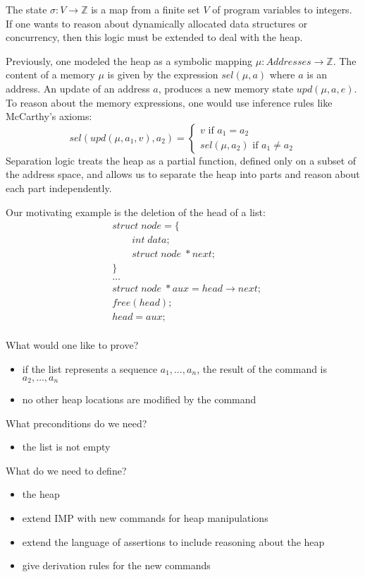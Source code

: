 \documentclass[12pt]{article}
\begin{document}
The state $\sigma : V \to \mathbb{Z}$ is a map from a finite set $V$ of program variables to integers. If one wants to reason about dynamically allocated data structures or concurrency, then this logic must be extended to deal with the heap. 

Previously, one modeled the heap as a symbolic mapping $\mu : Addresses \to \mathbb{Z}$. The content of a memory $\mu$ is given by the expression $sel(\mu,a)$ where $a$ is an address. An update of an address $a$, produces a new memory state $upd(\mu,a,e)$. To reason about the memory expressions, one would use inference rules like McCarthy's axioms:
\[
sel(upd(\mu,a_1,v), a_2)= \begin{cases}
v \mbox{ if } a_1 = a_2\\
sel(\mu,a_2) \mbox{ if } a_1 \neq a_2
\end{cases}
\]
Separation logic treats the heap as a partial function, defined only on a subset of the address space, and allows us to separate the heap into parts and reason about each part independently.

Our motivating example is the deletion of the head of a list:
\begin{align*}
&struct \; node = \{\\
&\qquad int \; data;\\
&\qquad struct \; node \; *next;\\
&\}\\
&\dots\\
&struct \; node \; *aux = head \to next;\\
&free(head);\\
&head = aux;\\
\end{align*}

What would one like to prove?
\begin{itemize}
\item if the list represents a sequence $a_1,\dots,a_n$, the result of the command is $a_2,\dots,a_n$
\item no other heap locations are modified by the command
\end{itemize}

What preconditions do we need?
\begin{itemize}
\item the list is not empty
\end{itemize}

What do we need to define?
\begin{itemize}
\item the heap
\item extend IMP with new commands for heap manipulations
\item extend the language of assertions to include reasoning about the heap
\item give derivation rules for the new commands
\end{itemize}
\end{document}
